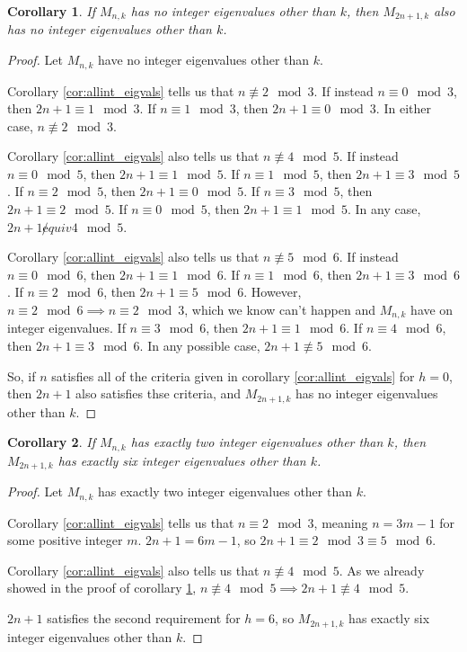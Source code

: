 \documentclass[12pt]{article}
\newtheorem{corollary}{Corollary}
\begin{document}
	
	\begin{corollary}\label{cor:0to0}
		If $M_{n,k}$ has no integer eigenvalues other than $k$, then $M_{2n+1,k}$ also
		has no integer eigenvalues other than $k$.
	\end{corollary}
	\begin{proof}
		Let $M_{n,k}$ have no integer eigenvalues other than $k$.
		
		Corollary \ref{cor:allint_eigvals} tells us that $n \not\equiv 2 \mod 3$.
		If instead $n \equiv 0 \mod 3$, then $2n+1 \equiv 1 \mod 3$.
		If $n \equiv 1 \mod 3$, then $2n + 1 \equiv 0 \mod 3$.
		In either case, $n \not \equiv 2 \mod 3$.
		
		Corollary \ref{cor:allint_eigvals} also tells us that $n \not\equiv 4 \mod 5$.
		If instead $n \equiv 0 \mod 5$, then $2n+1 \equiv 1 \mod 5$.
		If $n \equiv 1 \mod 5$, then $2n+1 \equiv 3 \mod 5$.
		If $n \equiv 2 \mod 5$, then $2n+1 \equiv 0 \mod 5$.
		If $n \equiv 3 \mod 5$, then $2n+1 \equiv 2 \mod 5$.
		If $n \equiv 0 \mod 5$, then $2n+1 \equiv 1 \mod 5$.
		In any case, $2n+1 \not equiv 4 \mod 5$.
		
		Corollary \ref{cor:allint_eigvals} also tells us that $n \not \equiv 5 \mod
		6$.
		If instead $n \equiv 0 \mod 6$, then $2n+1 \equiv 1 \mod 6$.
		If $n \equiv 1 \mod 6$, then $2n+1 \equiv 3 \mod 6$.
		If $n \equiv 2 \mod 6$, then $2n+1 \equiv 5 \mod 6$.
		However, $n \equiv 2 \mod 6 \implies n \equiv 2 \mod 3$, which we know can't
		happen and $M_{n,k}$ have on integer eigenvalues.
		If $n \equiv 3 \mod 6$, then $2n+1 \equiv 1 \mod 6$.
		If $n \equiv 4 \mod 6$, then $2n+1 \equiv 3 \mod 6$.
		In any possible case, $2n+1 \not\equiv 5 \mod 6$.
		
		So, if $n$ satisfies all of the criteria given in corollary
		\ref{cor:allint_eigvals} for $h=0$, then $2n+1$ also satisfies thse criteria,
		and $M_{2n+1,k}$ has no integer eigenvalues other than $k$. 
	\end{proof}
	
	\begin{corollary}\label{cor:2to6}
		If $M_{n,k}$ has exactly two integer eigenvalues other than $k$, then
		$M_{2n+1,k}$ has exactly six integer eigenvalues other than $k$.
	\end{corollary}
	\begin{proof}
		Let $M_{n,k}$ has exactly two integer eigenvalues other than $k$.
		
		Corollary \ref{cor:allint_eigvals} tells us that $n \equiv 2 \mod 3$, meaning
		$n = 3m - 1$ for some positive integer $m$.
		$2n+1 = 6m - 1$, so $2n+1 \equiv 2 \mod 3 \equiv 5 \mod 6$.
		
		Corollary \ref{cor:allint_eigvals} also tells us that $n \not\equiv 4 \mod 5$.
		As we already showed in the proof of corollary \ref{cor:0to0}, $n \not\equiv 4
		\mod 5 \implies 2n+1 \not\equiv 4 \mod 5$.
		
		$2n+1$ satisfies the second requirement for $h=6$, so $M_{2n+1,k}$ has exactly
		six integer eigenvalues other than $k$.
	\end{proof}
	
\end{document}
